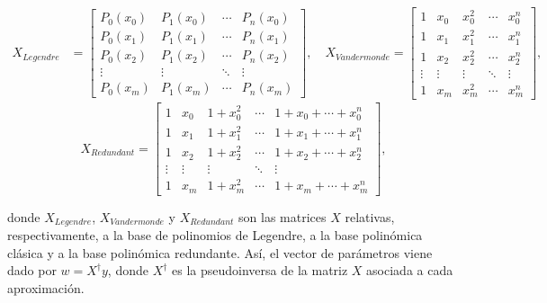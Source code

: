 \[
\begin{aligned}
    X_{Legendre} &= 
    \begin{bmatrix}
        P_0(x_0) & P_1(x_0) & \cdots & P_n(x_0) \\
        P_0(x_1) & P_1(x_1) & \cdots & P_n(x_1) \\
        P_0(x_2) & P_1(x_2) & \cdots & P_n(x_2) \\
        \vdots & \vdots & \ddots & \vdots \\
        P_0(x_m) & P_1(x_m) & \cdots & P_n(x_m)
    \end{bmatrix},
    \quad
    X_{Vandermonde} = 
    \begin{bmatrix}
        1 & x_0 & x_0^2 & \cdots & x_0^n \\
        1 & x_1 & x_1^2 & \cdots & x_1^n \\
        1 & x_2 & x_2^2 & \cdots & x_2^n \\
        \vdots & \vdots & \vdots & \ddots & \vdots \\
        1 & x_m & x_m^2 & \cdots & x_m^n
    \end{bmatrix},
\end{aligned}
\]
\vspace{0.5cm}
\[
X_{Redundant} = 
\begin{bmatrix}
    1 & x_0 & 1+x_0^2 & \cdots & 1+x_0+\cdots+x_0^n \\
    1 & x_1 & 1+x_1^2 & \cdots & 1+x_1+\cdots+x_1^n \\
    1 & x_2 & 1+x_2^2 & \cdots & 1+x_2+\cdots+x_2^n \\
    \vdots & \vdots  & \vdots & \ddots & \vdots \\
    1 & x_m & 1+x_m^2 & \cdots & 1+x_m+\cdots+x_m^n
\end{bmatrix},
\]

donde $X_{Legendre}$, $X_{Vandermonde}$ y $X_{Redundant}$ son las matrices $X$ relativas, respectivamente, a la base de polinomios de Legendre, a la base polinómica clásica y a la base polinómica redundante. Así, el vector de parámetros viene dado por $w = X^{\dagger} y$, donde $X^{\dagger}$ es la pseudoinversa de la matriz $X$ asociada a cada aproximación.

